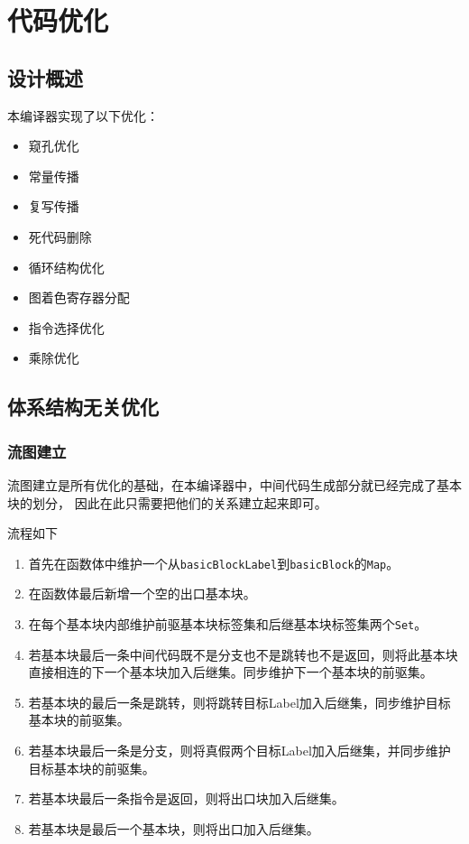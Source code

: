 \chapter{代码优化}

\section{设计概述}

本编译器实现了以下优化：
\begin{itemize}
    \item 窥孔优化
    \item 常量传播
    \item 复写传播
    \item 死代码删除
    \item 循环结构优化
    \item 图着色寄存器分配
    \item 指令选择优化
    \item 乘除优化
\end{itemize}

\section{体系结构无关优化}

\subsection{流图建立}
流图建立是所有优化的基础，在本编译器中，中间代码生成部分就已经完成了基本块的划分，
因此在此只需要把他们的关系建立起来即可。

流程如下
\begin{enumerate}
    \item 首先在函数体中维护一个从\texttt{basicBlockLabel}到\texttt{basicBlock}的\texttt{Map}。
    \item 在函数体最后新增一个空的出口基本块。
    \item 在每个基本块内部维护前驱基本块标签集和后继基本块标签集两个\texttt{Set}。
    \item 若基本块最后一条中间代码既不是分支也不是跳转也不是返回，则将此基本块直接相连的下一个基本块加入后继集。同步维护下一个基本块的前驱集。
    \item 若基本块的最后一条是跳转，则将跳转目标Label加入后继集，同步维护目标基本块的前驱集。
    \item 若基本块最后一条是分支，则将真假两个目标Label加入后继集，并同步维护目标基本块的前驱集。
    \item 若基本块最后一条指令是返回，则将出口块加入后继集。
    \item 若基本块是最后一个基本块，则将出口加入后继集。
\end{enumerate}

